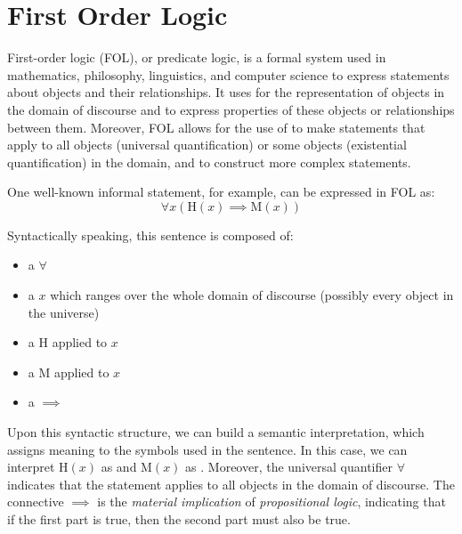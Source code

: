 \chapter{First Order Logic}\label{chap:first-order-logic}

\inlineminitoc{}

\noindent First-order logic (FOL), or predicate logic, is a formal system used in mathematics, philosophy, linguistics, and computer science to express statements about objects and their relationships.
It uses  for the representation of objects in the domain of discourse and  to express properties of these objects or relationships between them.
Moreover, FOL allows for the use of  to make statements that apply to all objects (universal quantification) or some objects (existential quantification) in the domain, and  to construct more complex statements.

One well-known informal statement,  for example, can be expressed in FOL as:
\begin{equation*}
    \forall x \left( \text{H}(x) \implies \text{M}(x) \right)
\end{equation*}

Syntactically speaking, this sentence is composed of:
\begin{itemize}
    \item a  \(\forall\)
    \item a  \(x\) which ranges over the whole domain of discourse (possibly every object in the universe)
    \item a  \(\text{H}\) applied to \(x\)
    \item a  \(\text{M}\) applied to \(x\)
    \item a  \(\implies\)
\end{itemize}

Upon this syntactic structure, we can build a semantic interpretation, which assigns meaning to the symbols used in the sentence.
In this case, we can interpret \(\text{H}(x)\) as  and \(\text{M}(x)\) as .
Moreover, the universal quantifier \(\forall\) indicates that the statement applies to all objects in the domain of discourse.
The connective \(\implies\) is the \emph{material implication} of \emph{propositional logic}, indicating that if the first part is true, then the second part must also be true.

